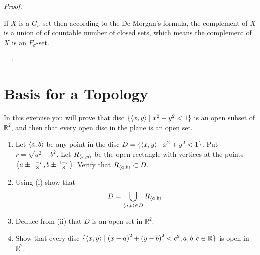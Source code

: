\begin{proof}
\begin{enumerate}[label={(\roman*)}]
              If $X$ is a $G_{\sigma}$-set then according to the De Morgan's formula, the complement of $X$ is a union of of countable number of closed sets, which means the complement of $X$ is an $F_{\sigma}$-set.
    \end{enumerate}
\end{proof}
\newpage

\section{Basis for a Topology}

\begin{exercise}
    In this exercise you will prove that disc $\{ \left\langle{x,y}\right\rangle \mid x^{2} + y^{2} < 1 \}$ is an open subset of $\mathbb{R}^{2}$, and then that every open disc in the plane is an open set.

    \begin{enumerate}[label={(\roman*)}]
        \item Let $\left\langle{a, b}\right\rangle$ be any point in the disc $D = \{ \left\langle{x, y}\right\rangle \mid x^{2} + y^{2} < 1 \}$. Put $r = \sqrt{a^{2} + b^{2}}$. Let $R_{\left\langle{x, y}\right\rangle}$ be the open rectangle with vertices at the points $\left\langle{a\pm\frac{1-r}{8}, b\pm\frac{1-r}{8}}\right\rangle$. Verify that $R_{\left\langle{a, b}\right\rangle}\subset D$.
        \item Using (i) show that
              \[
                  D = \bigcup_{\left\langle{a, b}\right\rangle\in D} R_{\left\langle{a, b}\right\rangle}.
              \]
        \item Deduce from (ii) that $D$ is an open set in $\mathbb{R}^{2}$.
        \item Show that every disc $\{ \left\langle{x, y}\right\rangle \mid {(x-a)}^{2} + {(y-b)}^{2} < c^{2}, a, b, c\in \mathbb{R} \}$ is open in $\mathbb{R}^{2}$.
    \end{enumerate}
\end{exercise}

